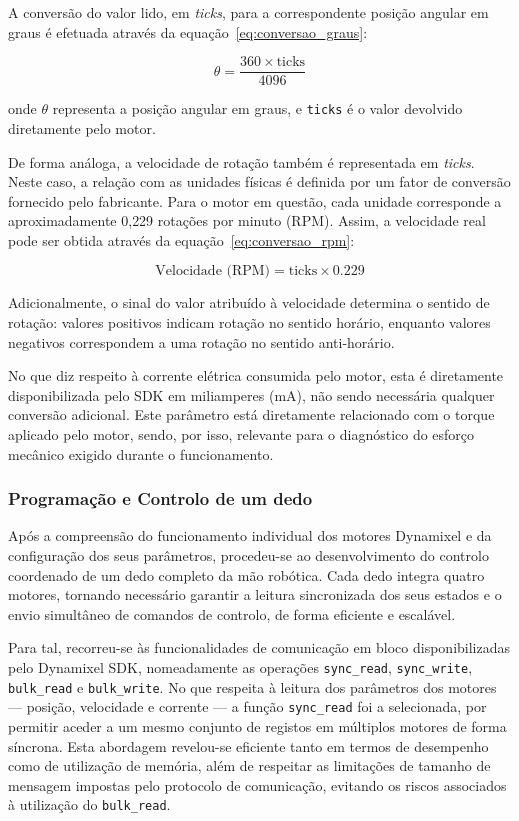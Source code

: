 A conversão do valor lido, em \textit{ticks}, para a correspondente posição angular em graus é efetuada através da equação~\eqref{eq:conversao_graus}:

\begin{equation}
\theta = \frac{360 \times \text{ticks}}{4096}
\label{eq:conversao_graus}
\end{equation}

onde $\theta$ representa a posição angular em graus, e \texttt{ticks} é o valor devolvido diretamente pelo motor.

De forma análoga, a velocidade de rotação também é representada em \textit{ticks}. Neste caso, a relação com as unidades físicas é definida por um fator de conversão fornecido pelo fabricante. Para o motor em questão, cada unidade corresponde a aproximadamente 0{,}229 rotações por minuto (RPM). Assim, a velocidade real pode ser obtida através da equação~\eqref{eq:conversao_rpm}:

\begin{equation}
\text{Velocidade (RPM)} = \text{ticks} \times 0.229
\label{eq:conversao_rpm}
\end{equation}

Adicionalmente, o sinal do valor atribuído à velocidade determina o sentido de rotação: valores positivos indicam rotação no sentido horário, enquanto valores negativos correspondem a uma rotação no sentido anti-horário.

No que diz respeito à corrente elétrica consumida pelo motor, esta é diretamente disponibilizada pelo SDK em miliamperes (mA), não sendo necessária qualquer conversão adicional. Este parâmetro está diretamente relacionado com o torque aplicado pelo motor, sendo, por isso, relevante para o diagnóstico do esforço mecânico exigido durante o funcionamento.


\subsubsection{Programação e Controlo de um dedo}

Após a compreensão do funcionamento individual dos motores Dynamixel e da configuração dos seus parâmetros, procedeu-se ao desenvolvimento do controlo coordenado de um dedo completo da mão robótica. Cada dedo integra quatro motores, tornando necessário garantir a leitura sincronizada dos seus estados e o envio simultâneo de comandos de controlo, de forma eficiente e escalável.

Para tal, recorreu-se às funcionalidades de comunicação em bloco disponibilizadas pelo Dynamixel SDK, nomeadamente as operações \texttt{sync\_read}, \texttt{sync\_write}, \texttt{bulk\_read} e \texttt{bulk\_write}. No que respeita à leitura dos parâmetros dos motores — posição, velocidade e corrente — a função \texttt{sync\_read} foi a selecionada, por permitir aceder a um mesmo conjunto de registos em múltiplos motores de forma síncrona. Esta abordagem revelou-se eficiente tanto em termos de desempenho como de utilização de memória, além de respeitar as limitações de tamanho de mensagem impostas pelo protocolo de comunicação, evitando os riscos associados à utilização do \texttt{bulk\_read}.

